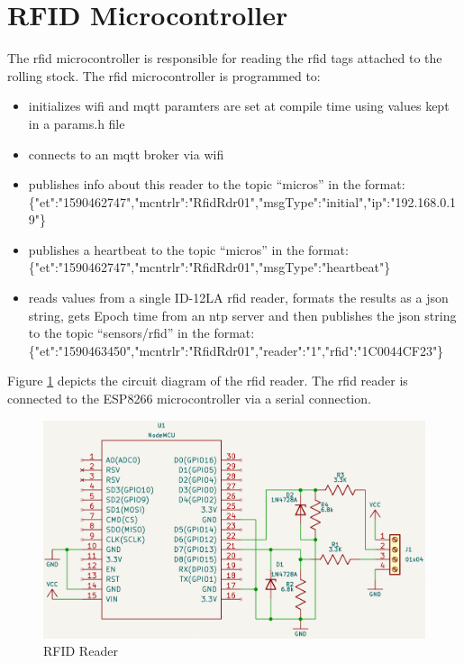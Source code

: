 \section{RFID Microcontroller} 
\label{sec:rfid-microcontroller}
The \gls{rfid} microcontroller is responsible for reading the \gls{rfid} tags attached to the rolling stock. The \gls{rfid} microcontroller is programmed to:
\begin{itemize}
\item initializes \gls{wifi} and \gls{mqtt} paramters are set at compile time using values kept in a params.h file
\item connects to an \gls{mqtt} broker via \gls{wifi}
\item publishes info about this reader to the topic ``micros'' in the format: \\
\{"et":"1590462747","mcntrlr":"RfidRdr01","msgType":"initial","ip":"192.168.0.19"\}
\item publishes a heartbeat to the topic ``micros'' in the format: \\
\{"et":"1590462747","mcntrlr":"RfidRdr01","msgType":"heartbeat"\}
\item reads values from a single ID-12LA \gls{rfid} reader, formats the results as a \gls{json} string, 
gets Epoch time from an \gls{ntp} server and then publishes the \gls{json} string to the topic ``sensors/rfid''
in the format: \\
\{"et":"1590463450","mcntrlr":"RfidRdr01","reader":"1","rfid":"1C0044CF23"\}
\end{itemize}

Figure \ref{fig:rfid-reader} depicts the circuit diagram of the \gls{rfid} reader. The \gls{rfid} reader is connected to the ESP8266 microcontroller via a serial connection.

\begin{figure}[htbp]
    \centering
    \includegraphics[width=\textwidth]{rfid-reader.png}
    \caption{RFID Reader}
    \label{fig:rfid-reader}
\end{figure}

